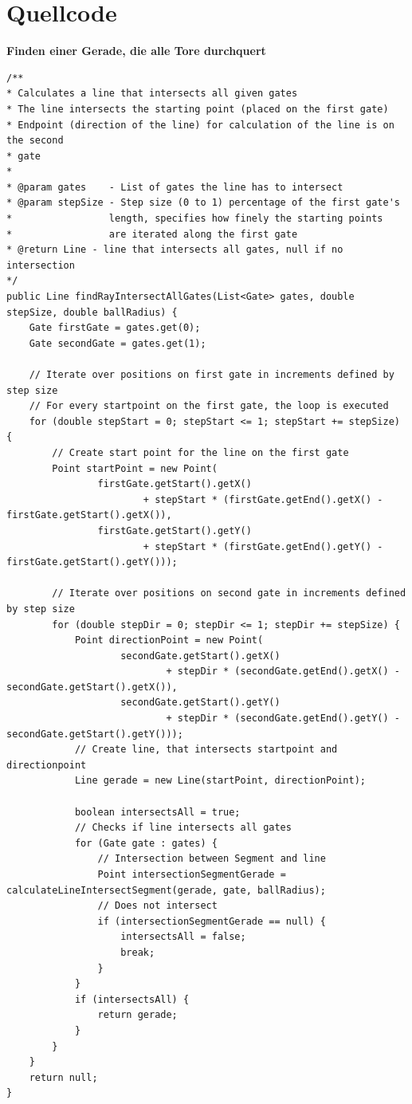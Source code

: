 \documentclass[a4paper,10pt,ngerman]{scrartcl}
\begin{document}
\section{Quellcode}
\textbf{Finden einer Gerade, die alle Tore durchquert}
\begin{lstlisting}
/**
* Calculates a line that intersects all given gates
* The line intersects the starting point (placed on the first gate)
* Endpoint (direction of the line) for calculation of the line is on the second
* gate
* 
* @param gates    - List of gates the line has to intersect
* @param stepSize - Step size (0 to 1) percentage of the first gate's
*                 length, specifies how finely the starting points
*                 are iterated along the first gate
* @return Line - line that intersects all gates, null if no intersection
*/
public Line findRayIntersectAllGates(List<Gate> gates, double stepSize, double ballRadius) {
    Gate firstGate = gates.get(0);
    Gate secondGate = gates.get(1);

    // Iterate over positions on first gate in increments defined by step size
    // For every startpoint on the first gate, the loop is executed
    for (double stepStart = 0; stepStart <= 1; stepStart += stepSize) {
        // Create start point for the line on the first gate
        Point startPoint = new Point(
                firstGate.getStart().getX()
                        + stepStart * (firstGate.getEnd().getX() - firstGate.getStart().getX()),
                firstGate.getStart().getY()
                        + stepStart * (firstGate.getEnd().getY() - firstGate.getStart().getY()));

        // Iterate over positions on second gate in increments defined by step size
        for (double stepDir = 0; stepDir <= 1; stepDir += stepSize) {
            Point directionPoint = new Point(
                    secondGate.getStart().getX()
                            + stepDir * (secondGate.getEnd().getX() - secondGate.getStart().getX()),
                    secondGate.getStart().getY()
                            + stepDir * (secondGate.getEnd().getY() - secondGate.getStart().getY()));
            // Create line, that intersects startpoint and directionpoint
            Line gerade = new Line(startPoint, directionPoint);

            boolean intersectsAll = true;
            // Checks if line intersects all gates
            for (Gate gate : gates) {
                // Intersection between Segment and line
                Point intersectionSegmentGerade = calculateLineIntersectSegment(gerade, gate, ballRadius);
                // Does not intersect
                if (intersectionSegmentGerade == null) {
                    intersectsAll = false;
                    break;
                }
            }
            if (intersectsAll) {
                return gerade;
            }
        }
    }
    return null;
}
\end{lstlisting}
\end{document}
